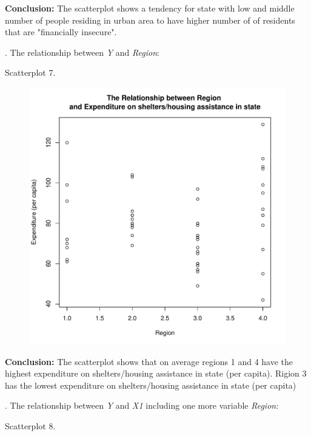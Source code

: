\documentclass[12pt,letterpaper]{article}
\begin{document}
\noindent \textbf{Conclusion:} The scatterplot shows a tendency for state with low and middle number of people residing in urban area to have higher number of of residents that are "financially insecure".
\vspace{.5cm}

\newpage
{}. The relationship between \emph{Y} and \emph{Region}:
  

\noindent Scatterplot 7.
\vspace{.5cm} 

\begin{figure}[h!]\centering
	\caption{\footnotesize }
	\label{fig:plot_1}
	\includegraphics[width=.75\textwidth]{plot2_1.pdf}
\end{figure}

\noindent \textbf{Conclusion:} The scatterplot shows that on average regions 1 and 4 have the highest expenditure on shelters/housing assistance in state (per capita). Rigion 3 has the lowest expenditure on shelters/housing assistance in state (per capita)

\newpage
{}. The relationship between \emph{Y} and \emph{X1} including one more variable \emph{Region}:
  

\noindent Scatterplot 8. 
\end{document}
